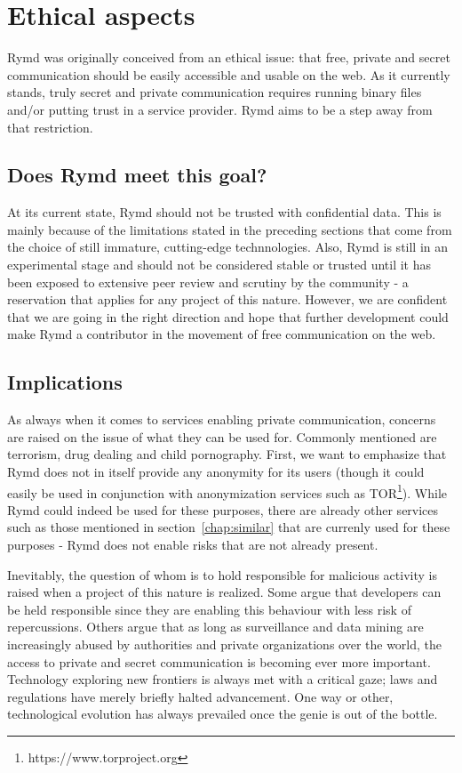 \section{Ethical aspects}
Rymd was originally conceived from an ethical issue: that free, private and secret communication should be easily accessible and usable on the web. As it currently stands, truly secret and private communication requires running binary files and/or putting trust in a service provider. Rymd aims to be a step away from that restriction.

\subsection{Does Rymd meet this goal?}
At its current state, Rymd should not be trusted with confidential data. This is mainly because of the limitations stated in the preceding sections that come from the choice of still immature, cutting-edge technnologies. Also, Rymd is still in an experimental stage and should not be considered stable or trusted until it has been exposed to extensive peer review and scrutiny by the community - a reservation that applies for any project of this nature. However, we are confident that we are going in the right direction and hope that further development could make Rymd a contributor in the movement of free communication on the web.

\subsection{Implications}
As always when it comes to services enabling private communication, concerns are raised on the issue of what they can be used for. Commonly mentioned are terrorism, drug dealing and child pornography. First, we want to emphasize that Rymd does not in itself provide any anonymity for its users (though it could easily be used in conjunction with anonymization services such as TOR\footnote{https://www.torproject.org}). While Rymd could indeed be used for these purposes, there are already other services such as those mentioned in section~\ref{chap:similar} that are currenly used for these purposes - Rymd does not enable risks that are not already present.

Inevitably, the question of whom is to hold responsible for malicious activity is raised when a project of this nature is realized. Some argue that developers can be held responsible since they are enabling this behaviour with less risk of repercussions. Others argue that as long as surveillance and data mining are increasingly abused by authorities and private organizations over the world, the access to private and secret communication is becoming ever more important. Technology exploring new frontiers is always met with a critical gaze; laws and regulations have merely briefly halted advancement. One way or other, technological evolution has always prevailed once the genie is out of the bottle.

